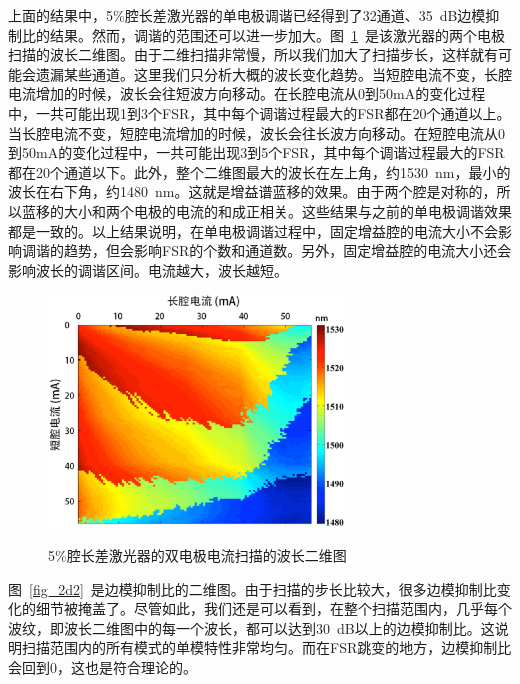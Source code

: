 \documentclass{ZJUthesis}
\begin{document}
上面的结果中，5\%腔长差激光器的单电极调谐已经得到了32通道、35~dB边模抑制比的结果。然而，调谐的范围还可以进一步加大。图~\ref{fig_2d}~是该激光器的两个电极扫描的波长二维图。由于二维扫描非常慢，所以我们加大了扫描步长，这样就有可能会遗漏某些通道。这里我们只分析大概的波长变化趋势。当短腔电流不变，长腔电流增加的时候，波长会往短波方向移动。在长腔电流从0到50mA的变化过程中，一共可能出现1到3个FSR，其中每个调谐过程最大的FSR都在20个通道以上。当长腔电流不变，短腔电流增加的时候，波长会往长波方向移动。在短腔电流从0到50mA的变化过程中，一共可能出现3到5个FSR，其中每个调谐过程最大的FSR都在20个通道以下。此外，整个二维图最大的波长在左上角，约1530~nm，最小的波长在右下角，约1480~nm。这就是增益谱蓝移的效果。由于两个腔是对称的，所以蓝移的大小和两个电极的电流的和成正相关。这些结果与之前的单电极调谐效果都是一致的。以上结果说明，在单电极调谐过程中，固定增益腔的电流大小不会影响调谐的趋势，但会影响FSR的个数和通道数。另外，固定增益腔的电流大小还会影响波长的调谐区间。电流越大，波长越短。

\begin{figure}[htbp]
  \centering
  \includegraphics[width=0.7\textwidth]{./Pictures/2d.eps}\\
  \caption{5\%腔长差激光器的双电极电流扫描的波长二维图}
  \label{fig_2d}
\end{figure}

图~\ref{fig_2d2}~是边模抑制比的二维图。由于扫描的步长比较大，很多边模抑制比变化的细节被掩盖了。尽管如此，我们还是可以看到，在整个扫描范围内，几乎每个波纹，即波长二维图中的每一个波长，都可以达到30~dB以上的边模抑制比。这说明扫描范围内的所有模式的单模特性非常均匀。而在FSR跳变的地方，边模抑制比会回到0，这也是符合理论的。
\end{document}
